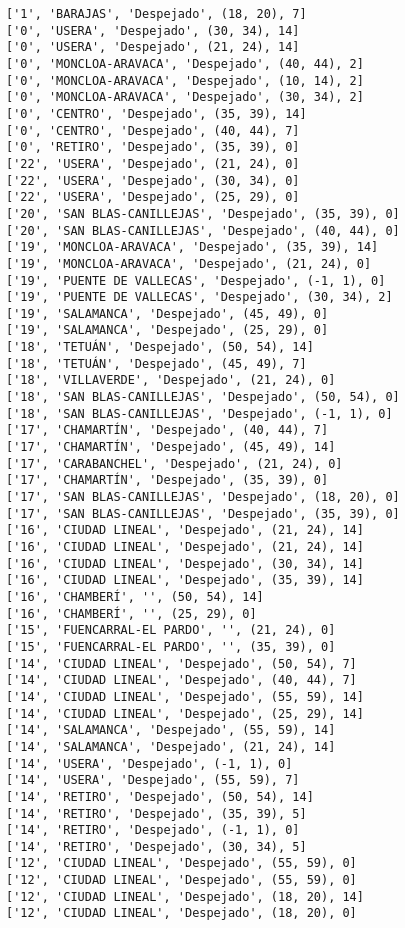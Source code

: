 \documentclass[11pt]{article}
\begin{document}
\begin{Verbatim}[commandchars=\\\{\}]
['1', 'BARAJAS', 'Despejado', (18, 20), 7]
['0', 'USERA', 'Despejado', (30, 34), 14]
['0', 'USERA', 'Despejado', (21, 24), 14]
['0', 'MONCLOA-ARAVACA', 'Despejado', (40, 44), 2]
['0', 'MONCLOA-ARAVACA', 'Despejado', (10, 14), 2]
['0', 'MONCLOA-ARAVACA', 'Despejado', (30, 34), 2]
['0', 'CENTRO', 'Despejado', (35, 39), 14]
['0', 'CENTRO', 'Despejado', (40, 44), 7]
['0', 'RETIRO', 'Despejado', (35, 39), 0]
['22', 'USERA', 'Despejado', (21, 24), 0]
['22', 'USERA', 'Despejado', (30, 34), 0]
['22', 'USERA', 'Despejado', (25, 29), 0]
['20', 'SAN BLAS-CANILLEJAS', 'Despejado', (35, 39), 0]
['20', 'SAN BLAS-CANILLEJAS', 'Despejado', (40, 44), 0]
['19', 'MONCLOA-ARAVACA', 'Despejado', (35, 39), 14]
['19', 'MONCLOA-ARAVACA', 'Despejado', (21, 24), 0]
['19', 'PUENTE DE VALLECAS', 'Despejado', (-1, 1), 0]
['19', 'PUENTE DE VALLECAS', 'Despejado', (30, 34), 2]
['19', 'SALAMANCA', 'Despejado', (45, 49), 0]
['19', 'SALAMANCA', 'Despejado', (25, 29), 0]
['18', 'TETUÁN', 'Despejado', (50, 54), 14]
['18', 'TETUÁN', 'Despejado', (45, 49), 7]
['18', 'VILLAVERDE', 'Despejado', (21, 24), 0]
['18', 'SAN BLAS-CANILLEJAS', 'Despejado', (50, 54), 0]
['18', 'SAN BLAS-CANILLEJAS', 'Despejado', (-1, 1), 0]
['17', 'CHAMARTÍN', 'Despejado', (40, 44), 7]
['17', 'CHAMARTÍN', 'Despejado', (45, 49), 14]
['17', 'CARABANCHEL', 'Despejado', (21, 24), 0]
['17', 'CHAMARTÍN', 'Despejado', (35, 39), 0]
['17', 'SAN BLAS-CANILLEJAS', 'Despejado', (18, 20), 0]
['17', 'SAN BLAS-CANILLEJAS', 'Despejado', (35, 39), 0]
['16', 'CIUDAD LINEAL', 'Despejado', (21, 24), 14]
['16', 'CIUDAD LINEAL', 'Despejado', (21, 24), 14]
['16', 'CIUDAD LINEAL', 'Despejado', (30, 34), 14]
['16', 'CIUDAD LINEAL', 'Despejado', (35, 39), 14]
['16', 'CHAMBERÍ', '', (50, 54), 14]
['16', 'CHAMBERÍ', '', (25, 29), 0]
['15', 'FUENCARRAL-EL PARDO', '', (21, 24), 0]
['15', 'FUENCARRAL-EL PARDO', '', (35, 39), 0]
['14', 'CIUDAD LINEAL', 'Despejado', (50, 54), 7]
['14', 'CIUDAD LINEAL', 'Despejado', (40, 44), 7]
['14', 'CIUDAD LINEAL', 'Despejado', (55, 59), 14]
['14', 'CIUDAD LINEAL', 'Despejado', (25, 29), 14]
['14', 'SALAMANCA', 'Despejado', (55, 59), 14]
['14', 'SALAMANCA', 'Despejado', (21, 24), 14]
['14', 'USERA', 'Despejado', (-1, 1), 0]
['14', 'USERA', 'Despejado', (55, 59), 7]
['14', 'RETIRO', 'Despejado', (50, 54), 14]
['14', 'RETIRO', 'Despejado', (35, 39), 5]
['14', 'RETIRO', 'Despejado', (-1, 1), 0]
['14', 'RETIRO', 'Despejado', (30, 34), 5]
['12', 'CIUDAD LINEAL', 'Despejado', (55, 59), 0]
['12', 'CIUDAD LINEAL', 'Despejado', (55, 59), 0]
['12', 'CIUDAD LINEAL', 'Despejado', (18, 20), 14]
['12', 'CIUDAD LINEAL', 'Despejado', (18, 20), 0]

\end{Verbatim}
\end{document}
